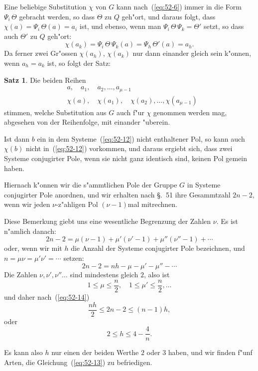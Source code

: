 \documentclass[12pt,a4paper]{article}
\theoremstyle{definition}
\newtheorem*{satz}{Satz}
\begin{document}
Eine beliebige Substitution $\chi$ von $G$ kann nach~(\ref{eq:52-6}) immer in die Form $\Psi_i\,\Theta$ gebracht werden, so dass $\Theta$ zu $Q$ geh"ort, und daraus folgt, dass $\chi(a) = \Psi_i\,\Theta(a) = a_i$ ist, und ebenso, wenn man $\Psi_i\,\Theta\,\Psi_k = \Theta'$ setzt, so dass auch $\Theta'$ zu $Q$ geh"ort:
\[
\chi(a_k) = \Psi_i\,\Theta\,\Psi_k(a) = \Psi_h\,\Theta'(a) = a_h.
\]
Da ferner zwei Gr"ossen $\chi(a_h)$, $\chi(a_k)$ nur dann einander gleich sein k"onnen, wenn $a_h = a_k$ ist, so folgt der Satz:

\begin{satz}
Die beiden Reihen
\begin{align*}
&a, \quad a_1, \quad a_2, \ldots, a_{\mu-1} \\
&\chi(a), \quad \chi(a_1), \quad \chi(a_2), \ldots, \chi(a_{\mu-1})
\end{align*}
stimmen, welche Substitution aus $G$ auch f"ur $\chi$ genommen werden mag, abgesehen von der Reihenfolge, mit einander "uberein.
\end{satz}

Ist dann $b$ ein in dem Systeme~(\ref{eq:52-12}) nicht enthaltener Pol, so kann auch $\chi(b)$ nicht in~(\ref{eq:52-12}) vorkommen, und daraus ergiebt sich, dass zwei Systeme conjugirter Pole, wenn sie nicht ganz identisch sind, keinen Pol gemein haben.

Hiernach k"onnen wir die s"ammtlichen Pole der Gruppe $G$ in Systeme conjugirter Pole anordnen, und wir erhalten nach \S.~51 ihre Gesammtzahl $2n - 2$, wenn wir jeden $\nu$-z"ahligen Pol $(\nu - 1)$mal mitrechnen.

Diese Bemerkung giebt uns eine wesentliche Begrenzung der Zahlen $\nu$. Es ist n"amlich danach:
\begin{equation}\label{eq:52-13}
2n - 2 = \mu(\nu - 1) + \mu'(\nu' - 1) + \mu''(\nu'' - 1) + \cdots
\end{equation}
oder, wenn wir mit $h$ die Anzahl der Systeme conjugirter Pole bezeichnen, und $n = \mu\nu = \mu'\nu' = \cdots$ setzen:
\begin{equation}\label{eq:52-14}
2n - 2 = nh - \mu - \mu' - \mu'' - \cdots
\end{equation}
Die Zahlen $\nu, \nu', \nu'' \ldots$ sind mindestens gleich $2$, also ist
\[
1 \leq \mu \leq \frac{n}{2}, \quad 1 \leq \mu' \leq \frac{n}{2}, \ldots
\]
und daher nach~(\ref{eq:52-14})
\[
\frac{nh}{2} \leq 2n - 2 \leq (n - 1)h,
\]
oder
\[
2 \leq h \leq 4 - \frac{4}{n}.
\]

Es kann also $h$ nur einen der beiden Werthe $2$ oder $3$ haben, und wir finden f"unf Arten, die Gleichung~(\ref{eq:52-13}) zu befriedigen.
\end{document}
